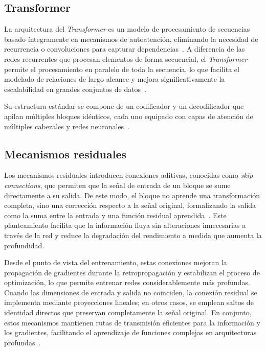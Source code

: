 \subsection{Transformer}
La arquitectura del \textit{Transformer} es un modelo de procesamiento de secuencias basado íntegramente en mecanismos de autoatención, eliminando la necesidad de recurrencia o convoluciones para capturar dependencias~\cite{vaswani2017attention, khan2022transformersvision}. A diferencia de las redes recurrentes que procesan elementos de forma secuencial, el \textit{Transformer} permite el procesamiento en paralelo de toda la secuencia, lo que facilita el modelado de relaciones de largo alcance y mejora significativamente la escalabilidad en grandes conjuntos de datos~\cite{khan2022transformersvision, mamba2023linear}. 

Su estructura estándar se compone de un codificador y un decodificador que apilan múltiples bloques idénticos, cada uno equipado con capas de atención de múltiples cabezales y redes neuronales~\cite{vaswani2017attention, bala2025visiontranscoder}.

\subsection{Mecanismos residuales}

Los mecanismos residuales introducen conexiones aditivas, conocidas como \textit{skip connections}, que permiten que la señal de entrada de un bloque se sume directamente a su salida. De este modo, el bloque no aprende una transformación completa, sino una corrección respecto a la señal original, formalizando la salida como la suma entre la entrada y una función residual aprendida~\cite{he2016resnet}. Este planteamiento facilita que la información fluya sin alteraciones innecesarias a través de la red y reduce la degradación del rendimiento a medida que aumenta la profundidad.

Desde el punto de vista del entrenamiento, estas conexiones mejoran la propagación de gradientes durante la retropropagación y estabilizan el proceso de optimización, lo que permite entrenar redes considerablemente más profundas. Cuando las dimensiones de entrada y salida no coinciden, la conexión residual se implementa mediante proyecciones lineales; en otros casos, se emplean saltos de identidad directos que preservan completamente la señal original. En conjunto, estos mecanismos mantienen rutas de transmisión eficientes para la información y los gradientes, facilitando el aprendizaje de funciones complejas en arquitecturas profundas~\cite{srivastava2015highway}.


